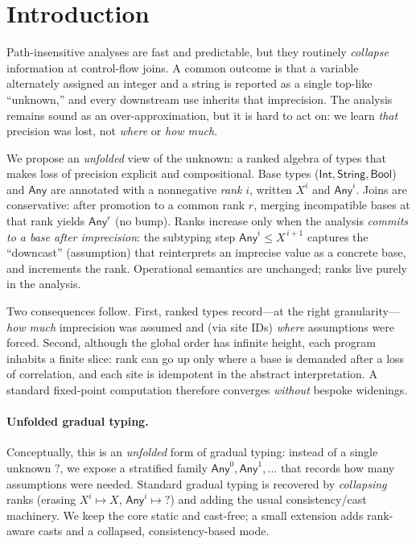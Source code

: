\section{Introduction}

Path-insensitive analyses are fast and predictable, but they routinely \emph{collapse} information at control-flow joins.
A common outcome is that a variable alternately assigned an integer and a string is reported as a single top-like ``unknown,'' and every downstream use inherits that imprecision.
The analysis remains sound as an over-approximation, but it is hard to act on: we learn \emph{that} precision was lost, not \emph{where} or \emph{how much}.

We propose an \emph{unfolded} view of the unknown: a ranked algebra of types that makes loss of precision explicit and compositional.
Base types (\(\mathsf{Int},\mathsf{String},\mathsf{Bool}\)) and \(\mathsf{Any}\) are annotated with a nonnegative \emph{rank} \(i\), written \(X^{i}\) and \(\mathsf{Any}^{i}\).
Joins are conservative: after promotion to a common rank \(r\), merging incompatible bases at that rank yields \(\mathsf{Any}^{r}\) (no bump).
Ranks increase only when the analysis \emph{commits to a base after imprecision}:
the subtyping step \(\mathsf{Any}^{i} \le X^{\,i+1}\) captures the ``downcast'' (assumption) that reinterprets an imprecise value as a concrete base, and increments the rank.
Operational semantics are unchanged; ranks live purely in the analysis.

Two consequences follow.
First, ranked types record—at the right granularity—\emph{how much} imprecision was assumed and (via site IDs) \emph{where} assumptions were forced.
Second, although the global order has infinite height, each program inhabits a finite slice:
rank can go up only where a base is demanded after a loss of correlation, and each site is idempotent in the abstract interpretation.
A standard fixed-point computation therefore converges \emph{without} bespoke widenings.

\paragraph{Unfolded gradual typing.}
Conceptually, this is an \emph{unfolded} form of gradual typing: instead of a single unknown \(?\), we expose a stratified family \(\mathsf{Any}^{0},\mathsf{Any}^{1},\ldots\) that records how many assumptions were needed.
Standard gradual typing is recovered by \emph{collapsing} ranks (erasing \(X^{i}\mapsto X\), \(\mathsf{Any}^{i}\mapsto ?\)) and adding the usual consistency/cast machinery.
We keep the core static and cast-free; a small extension adds rank-aware casts and a collapsed, consistency-based mode.

